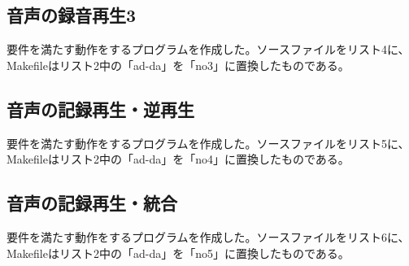 \documentclass{jarticle}
\begin{document}
\subsection{音声の録音再生3}
要件を満たす動作をするプログラムを作成した。ソースファイルをリスト4に、Makefileはリスト2中の「ad-da」を「no3」に置換したものである。

\subsection{音声の記録再生・逆再生}
要件を満たす動作をするプログラムを作成した。ソースファイルをリスト5に、Makefileはリスト2中の「ad-da」を「no4」に置換したものである。

\subsection{音声の記録再生・統合}
要件を満たす動作をするプログラムを作成した。ソースファイルをリスト6に、Makefileはリスト2中の「ad-da」を「no5」に置換したものである。
\end{document}
